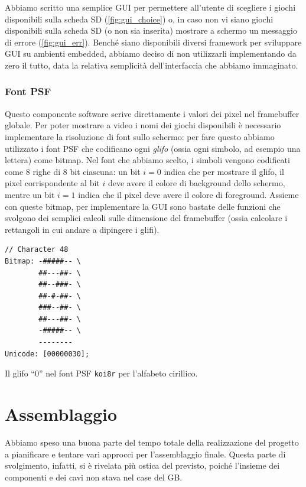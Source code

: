 \documentclass[hidelinks,12pt]{article}
\begin{document}
Abbiamo scritto una semplice GUI per permettere all'utente di scegliere i giochi
disponibili sulla scheda SD (\cref{fig:gui_choice}) o, in caso non vi siano
giochi disponibili sulla scheda SD (o non sia inserita) mostrare a schermo un
messaggio di errore (\cref{fig:gui_err}).
Benché siano disponibili diversi framework per sviluppare GUI su ambienti
embedded, abbiamo deciso di non utilizzarli implementando da zero il tutto, data
la relativa semplicità dell'interfaccia che abbiamo immaginato.

\subsubsection{Font PSF}
Questo componente software scrive direttamente i valori dei pixel nel
framebuffer globale. Per poter mostrare a video i nomi dei giochi disponibili è
necessario implementare la risoluzione di font sullo schermo: per fare questo
abbiamo utilizzato i font PSF che codificano ogni \textit{glifo} (ossia ogni
simbolo, ad esempio una lettera) come bitmap. Nel font che abbiamo scelto, i
simboli vengono codificati come $8$ righe di $8$ bit ciascuna: un bit $i = 0$
indica che per mostrare il glifo, il pixel corrispondente al bit $i$ deve avere
il colore di background dello schermo, mentre un bit $i = 1$ indica che il pixel
deve avere il colore di foreground. Assieme con queste bitmap, per implementare
la GUI sono bastate delle funzioni che svolgono dei  semplici calcoli sulle
dimensione del framebuffer (ossia calcolare i rettangoli in cui andare a
dipingere i glifi).
\begin{table}[h]
	\begin{verbatim}
// Character 48
Bitmap: -#####-- \
        ##---##- \
        ##--###- \
        ##-#-##- \
        ###--##- \
        ##---##- \
        -#####-- \
        --------
Unicode: [00000030];
	\end{verbatim}
	\caption{Il glifo ``0'' nel font PSF \texttt{koi8r} per l'alfabeto cirillico.}
\end{table}

\section{Assemblaggio}
Abbiamo speso una buona parte del tempo totale della realizzazione del progetto
a pianificare e tentare vari approcci per l'assemblaggio finale. Questa parte di
svolgimento, infatti, si è rivelata più ostica del previsto, poiché l'insieme
dei componenti e dei cavi non stava nel case del GB.
\end{document}
